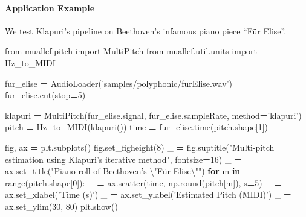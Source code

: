 \documentclass[american,]{article}
\newenvironment{Shaded}{\begin{snugshade}}{\end{snugshade}}
\newcommand{\BuiltInTok}[1]{#1}
\newcommand{\CharTok}[1]{\textcolor[rgb]{0.31,0.60,0.02}{#1}}
\newcommand{\ControlFlowTok}[1]{\textcolor[rgb]{0.13,0.29,0.53}{\textbf{#1}}}
\newcommand{\DecValTok}[1]{\textcolor[rgb]{0.00,0.00,0.81}{#1}}
\newcommand{\ImportTok}[1]{#1}
\newcommand{\KeywordTok}[1]{\textcolor[rgb]{0.13,0.29,0.53}{\textbf{#1}}}
\newcommand{\NormalTok}[1]{#1}
\newcommand{\OperatorTok}[1]{\textcolor[rgb]{0.81,0.36,0.00}{\textbf{#1}}}
\newcommand{\StringTok}[1]{\textcolor[rgb]{0.31,0.60,0.02}{#1}}
\let\oldparagraph\paragraph
\renewcommand{\paragraph}[1]{\oldparagraph{#1}\mbox{}}
\begin{document}
\hypertarget{application-example-1}{%
\paragraph{Application Example}\label{application-example-1}}

We test Klapuri's pipeline on Beethoven's infamous piano
piece ``Für Elise''.

\begin{Shaded}
\begin{Highlighting}[]
\ImportTok{from}\NormalTok{ muallef.pitch }\ImportTok{import}\NormalTok{ MultiPitch}
\ImportTok{from}\NormalTok{ muallef.util.units }\ImportTok{import}\NormalTok{ Hz_to_MIDI}

\NormalTok{fur_elise }\OperatorTok{=}\NormalTok{ AudioLoader(}\StringTok{'samples/polyphonic/furElise.wav'}\NormalTok{)}
\NormalTok{fur_elise.cut(stop}\OperatorTok{=}\DecValTok{5}\NormalTok{)}

\NormalTok{klapuri }\OperatorTok{=}\NormalTok{ MultiPitch(fur_elise.signal, fur_elise.sampleRate, method}\OperatorTok{=}\StringTok{'klapuri'}\NormalTok{)}
\NormalTok{pitch }\OperatorTok{=}\NormalTok{ Hz_to_MIDI(klapuri())}
\NormalTok{time }\OperatorTok{=}\NormalTok{ fur_elise.time(pitch.shape[}\DecValTok{1}\NormalTok{])}

\NormalTok{fig, ax }\OperatorTok{=}\NormalTok{ plt.subplots()}
\NormalTok{fig.set_figheight(}\DecValTok{8}\NormalTok{)}
\NormalTok{_ }\OperatorTok{=}\NormalTok{ fig.suptitle(}\StringTok{"Multi-pitch estimation using Klapuri's iterative method"}\NormalTok{, fontsize}\OperatorTok{=}\DecValTok{16}\NormalTok{)}
\NormalTok{_ }\OperatorTok{=}\NormalTok{ ax.set_title(}\StringTok{"Piano roll of Beethoven's }\CharTok{\textbackslash{}"}\StringTok{Für Elise}\CharTok{\textbackslash{}"}\StringTok{"}\NormalTok{)}
\ControlFlowTok{for}\NormalTok{ m }\KeywordTok{in} \BuiltInTok{range}\NormalTok{(pitch.shape[}\DecValTok{0}\NormalTok{]):}
\NormalTok{    _ }\OperatorTok{=}\NormalTok{ ax.scatter(time, np.}\BuiltInTok{round}\NormalTok{(pitch[m]), s}\OperatorTok{=}\DecValTok{5}\NormalTok{)}
\NormalTok{_ }\OperatorTok{=}\NormalTok{ ax.set_xlabel(}\StringTok{'Time (s)'}\NormalTok{)}
\NormalTok{_ }\OperatorTok{=}\NormalTok{ ax.set_ylabel(}\StringTok{'Estimated Pitch (MIDI)'}\NormalTok{)}
\NormalTok{_ }\OperatorTok{=}\NormalTok{ ax.set_ylim(}\DecValTok{30}\NormalTok{, }\DecValTok{80}\NormalTok{)}
\NormalTok{plt.show()}
\end{Highlighting}
\end{Shaded}
\end{document}
